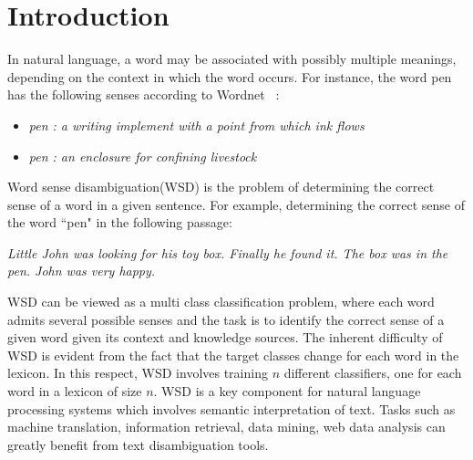 \documentclass[11pt,letterpaper]{article}
\newcommand{\blue}[1]{\textcolor{RoyalBlue}{#1}}
\newcommand{\instructions}[1]{\blue{\textit{#1}}}
\begin{document}
\section{Introduction} 
\label{sec:introduction}

In natural language, a word may be associated with possibly multiple meanings, depending on the context in which the word occurs. For instance, the word pen has the following senses according to Wordnet ~\cite{wordnet}:
\begin{itemize}
\item \emph{pen : a writing implement with a point from which ink flows}
\item \emph{pen : an enclosure for confining livestock}
\end{itemize}
Word sense disambiguation(WSD) is the problem of determining the correct sense of a word in a given sentence. For example, determining the correct sense of the word ``pen" in the following passage:

\emph{Little John was looking for his toy box. Finally he found it. The box was in the pen. John was very happy.}

WSD can be viewed as a multi class classification problem, where each word admits several possible senses and the task is to identify the correct sense of a given word given its context and knowledge sources. The inherent difficulty of WSD is evident from the fact that the target classes change for each word in the lexicon. In this respect, WSD involves training $n$ different classifiers, one for each word in a lexicon of size $n$. 
WSD is a key component for natural language processing systems which involves semantic interpretation of text. Tasks such as machine translation, information retrieval, data mining, web data analysis can greatly benefit from text disambiguation tools. 
\end{document}
